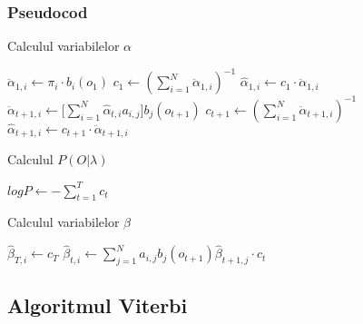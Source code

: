 \documentclass[12pt]{article}
\begin{document}
\subsubsection{Pseudocod}
\label{sec:pseudocod-fb}

\begin{algorithm}[H]
  \caption{Calculul variabilelor $\alpha$}
  \label{alg1:alpha}
  \begin{algorithmic}[1]
     \STATE $\ddot{\alpha}_{1,i} \leftarrow
    \pi_i \cdot b_i(o_1)$
    \ENDFOR
    \STATE $c_1 \leftarrow (\displaystyle\sum_{i=1}^{N}
    \ddot{\alpha}_{1,i})^{-1}$  \STATE
    $\hat{\alpha}_{1,i} \leftarrow c_1 \cdot \ddot{\alpha}_{1,i}$
    \ENDFOR
      \STATE
    $\ddot{\alpha}_{t+1,i} \leftarrow \Big[
    \displaystyle\sum_{i=1}^{N}\hat{\alpha}_{t,i}a_{i,j}\Big]
    b_{j}(o_{t+1})$
    \ENDFOR
    \STATE $c_{t+1} \leftarrow (\displaystyle\sum_{i=1}^{N}
    \ddot{\alpha}_{t+1,i})^{-1}$  \STATE
    $\hat{\alpha}_{t+1,i} \leftarrow c_{t+1} \cdot
    \ddot{\alpha}_{t+1,i}$
    \ENDFOR
    \ENDFOR
  \end{algorithmic}
\end{algorithm}

\begin{algorithm}[H]
  \caption{Calculul $P(O \vert \lambda)$}
  \label{alg2:logP}
  \begin{algorithmic}[1]
    \STATE $logP \leftarrow -\displaystyle\sum_{t=1}^{T}c_t$
  \end{algorithmic}
\end{algorithm}

\begin{algorithm}[H]
  \caption{Calculul variabilelor $\beta$}
  \label{alg3:beta}
  \begin{algorithmic}[1]
     \STATE $\hat{\beta}_{T,i} \leftarrow
    c_T$
    \ENDFOR
      \STATE
    $\hat{\beta}_{t,i} \leftarrow \displaystyle\sum_{j=1}^{N}
    a_{i,j} b_{j}(o_{t+1}) \hat{\beta}_{t+1,j} \cdot c_t$
    \ENDFOR
    \ENDFOR
  \end{algorithmic}
\end{algorithm}


\subsection{Algoritmul Viterbi}
\label{sec:viterbi}
\end{document}
